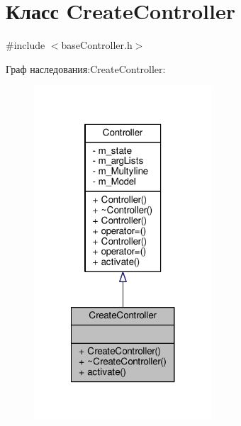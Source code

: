 \hypertarget{class_create_controller}{\section{Класс Create\-Controller}
\label{class_create_controller}
}


{\ttfamily \#include $<$base\-Controller.\-h$>$}



Граф наследования\-:Create\-Controller\-:
\nopagebreak
\begin{figure}[H]
\begin{center}
\leavevmode
\includegraphics[width=188pt]{class_create_controller__inherit__graph}
\end{center}
\end{figure}


